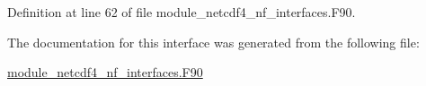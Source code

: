 Definition at line 62 of file module\+\_\+netcdf4\+\_\+nf\+\_\+interfaces.\+F90.



The documentation for this interface was generated from the following file\+:\begin{DoxyCompactItemize}
\item 
\hyperlink{module__netcdf4__nf__interfaces_8F90}{module\+\_\+netcdf4\+\_\+nf\+\_\+interfaces.\+F90}\end{DoxyCompactItemize}
